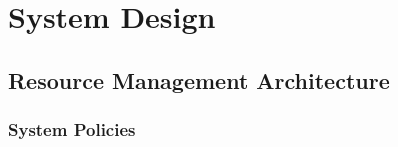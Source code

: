 \section{System Design}
\label{sec:design}
\subsection{Resource Management Architecture}
\subsubsection{System Policies}